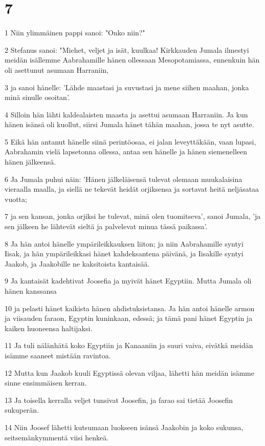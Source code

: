 \chapter{7}

\par 1 Niin ylimmäinen pappi sanoi: "Onko niin?"
\par 2 Stefanus sanoi: "Miehet, veljet ja isät, kuulkaa! Kirkkauden Jumala ilmestyi meidän isällemme Aabrahamille hänen ollessaan Mesopotamiassa, ennenkuin hän oli asettunut asumaan Harraniin,
\par 3 ja sanoi hänelle: 'Lähde maastasi ja suvustasi ja mene siihen maahan, jonka minä sinulle osoitan'.
\par 4 Silloin hän lähti kaldealaisten maasta ja asettui asumaan Harraniin. Ja kun hänen isänsä oli kuollut, siirsi Jumala hänet tähän maahan, jossa te nyt asutte.
\par 5 Eikä hän antanut hänelle siinä perintöosaa, ei jalan leveyttäkään, vaan lupasi, Aabrahamin vielä lapsetonna ollessa, antaa sen hänelle ja hänen siemenelleen hänen jälkeensä.
\par 6 Ja Jumala puhui näin: 'Hänen jälkeläisensä tulevat olemaan muukalaisina vieraalla maalla, ja siellä ne tekevät heidät orjiksensa ja sortavat heitä neljäsataa vuotta;
\par 7 ja sen kansan, jonka orjiksi he tulevat, minä olen tuomitseva', sanoi Jumala, 'ja sen jälkeen he lähtevät sieltä ja palvelevat minua tässä paikassa'.
\par 8 Ja hän antoi hänelle ympärileikkauksen liiton; ja niin Aabrahamille syntyi Iisak, ja hän ympärileikkasi hänet kahdeksantena päivänä, ja Iisakille syntyi Jaakob, ja Jaakobille ne kaksitoista kantaisää.
\par 9 Ja kantaisät kadehtivat Joosefia ja myivät hänet Egyptiin. Mutta Jumala oli hänen kanssansa
\par 10 ja pelasti hänet kaikista hänen ahdistuksistansa. Ja hän antoi hänelle armon ja viisauden faraon, Egyptin kuninkaan, edessä; ja tämä pani hänet Egyptin ja kaiken huoneensa haltijaksi.
\par 11 Ja tuli nälänhätä koko Egyptiin ja Kanaaniin ja suuri vaiva, eivätkä meidän isämme saaneet mistään ravintoa.
\par 12 Mutta kun Jaakob kuuli Egyptissä olevan viljaa, lähetti hän meidän isämme sinne ensimmäisen kerran.
\par 13 Ja toisella kerralla veljet tunsivat Joosefin, ja farao sai tietää Joosefin sukuperän.
\par 14 Niin Joosef lähetti kutsumaan luokseen isänsä Jaakobin ja koko sukunsa, seitsemänkymmentä viisi henkeä.
